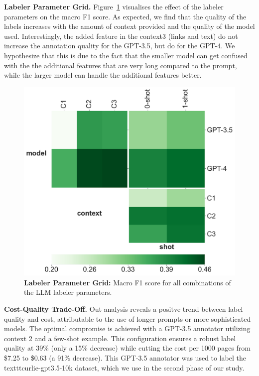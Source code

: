 \textbf{Labeler Parameter Grid.} Figure~\ref{fig:labelers-grid} visualises the effect of the labeler parameters on the macro F1 score. As expected, we find that the quality of the labels increases with the amount of context provided and the quality of the model used. 
Interestingly, the added feature in the context3 (links and text) do not increase the annotation quality for the GPT-3.5, but do for the GPT-4. 
We hypothesize that this is due to the fact that the smaller model can get confused with the the additional features that are very long compared to the prompt, while the larger model can handle the additional features better. 


\begin{figure}[!h]
    \centering
    \includegraphics[width=.8\columnwidth]{./figures/labelers-grid.pdf}
    \caption{\textbf{Labeler Parameter Grid:} Macro F1 score for all combinations of the LLM labeler parameters.}

    \label{fig:labelers-grid}
\end{figure}

\textbf{Cost-Quality Trade-Off.} 
Out analysis reveals a positve trend between label quality and cost, attributable to the use of longer prompts or more sophisticated models.
The optimal compromise is achieved with a GPT-3.5 annotator utilizing context 2 and a few-shot example. This configuration ensures a robust label quality at 39\% (only a 15\% decrease) while cutting the cost per 1000 pages from \$7.25 to \$0.63 (a 91\% decrease). 
This GPT-3.5 annotator was used to label the texttt{curlie-gpt3.5-10k} dataset, which we use in the second phase of our study.

